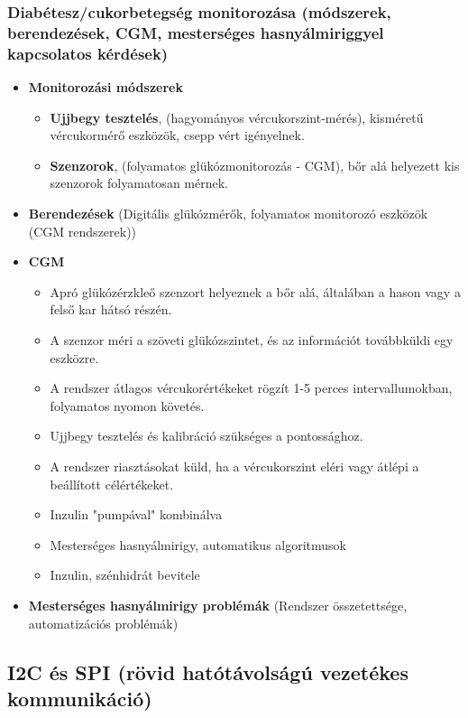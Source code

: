 \subsubsection{Diabétesz/cukorbetegség monitorozása (módszerek, berendezések, CGM, mesterséges hasnyálmiriggyel kapcsolatos kérdések)}
\begin{itemize}
    \item \textbf{Monitorozási módszerek}
    \begin{itemize}
        \item \textbf{Ujjbegy tesztelés}, (hagyományos vércukorszint-mérés), kisméretű vércukormérő eszközök, csepp vért igényelnek.
        \item \textbf{Szenzorok}, (folyamatos glükózmonitorozás - CGM), bőr alá helyezett kis szenzorok folyamatosan mérnek.
    \end{itemize}
    \item \textbf{Berendezések} (Digitális glükózmérők, folyamatos monitorozó eszközök (CGM rendszerek))
    \item \textbf{CGM}
    \begin{itemize}
        \item Apró glükózérzkleő szenzort helyeznek a bőr alá, általában a hason vagy a felső kar hátsó részén.
        \item A szenzor méri a szöveti glükózszintet, és az információt továbbküldi egy eszközre.
        \item A rendszer átlagos vércukorértékeket rögzít 1-5 perces intervallumokban, folyamatos nyomon követés.
        \item Ujjbegy tesztelés és kalibráció szükséges a pontossághoz.
        \item A rendszer riasztásokat küld, ha a vércukorszint eléri vagy átlépi a beállított célértékeket.
        \item Inzulin "pumpával" kombinálva
        \item Mesterséges hasnyálmirigy, automatikus algoritmusok
        \item Inzulin, szénhidrát bevitele
    \end{itemize}
    \item \textbf{Mesterséges hasnyálmirigy problémák} (Rendszer összetettsége, automatizációs problémák)
\end{itemize}

\clearpage
\subsection{I2C és SPI (rövid hatótávolságú vezetékes kommunikáció)}
